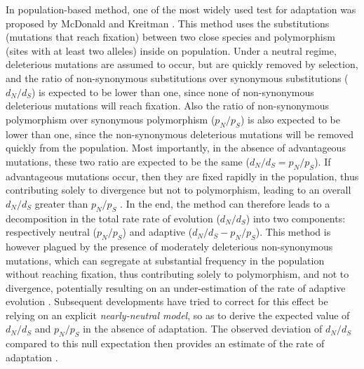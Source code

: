 \documentclass{article}
\begin{document}
	In population-based method, one of the most widely used test for adaptation was proposed by McDonald and Kreitman \cite{McDonald1991}. This method uses the substitutions (mutations that reach fixation) between two close species and polymorphism (sites with at least two alleles) inside on population. Under a neutral regime, deleterious mutations are assumed to occur, but are quickly removed by selection, and the ratio of non-synonymous substitutions over synonymous substitutions ($d_N/d_S$) is expected to be lower than one, since none of non-synonymous deleterious mutations will reach fixation. Also the ratio of non-synonymous polymorphism over synonymous polymorphism ($p_N/p_S$) is also expected to be lower than one, since the non-synonymous deleterious mutations will be removed quickly from the population. Most importantly, in the absence of advantageous mutations, these two ratio are expected to be the same ($d_N/d_S=p_N/p_S$). If advantageous mutations occur, then they are fixed rapidly in the population, thus contributing solely to divergence but not to polymorphism, leading to an overall $d_N/d_S$ greater than $p_N/p_S$ \cite{smith_adaptive_2002, kimura_neutral_1983}. In the end, the method can therefore leads to a decomposition in the total rate rate of evolution ($d_N/d_S$) into two components: respectively neutral ($p_N/p_S$) and adaptive ($d_N/d_S-p_N/p_S$). This method is however plagued by the presence of moderately deleterious non-synonymous mutations, which can segregate at substantial frequency in the population without reaching fixation, thus contributing solely to polymorphism, and not to divergence, potentially resulting on an under-estimation of the rate of adaptive evolution \cite{eyre-walker_quantifying_2002}. Subsequent developments have tried to correct for this effect be relying on an explicit \textit{nearly-neutral model}, so as to derive the expected value of $d_N/d_S$ and $p_N/p_S$ in the absence of adaptation. The observed deviation of $d_N/d_S$ compared to this null expectation then provides an estimate of the rate of adaptation \cite{eyre-walker_estimating_2009, galtier_adaptive_2016}. \\
\end{document}
